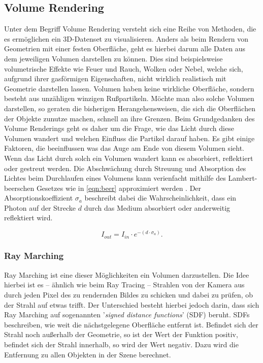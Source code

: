 \newpage
\subsection{Volume Rendering}

Unter dem Begriff Volume Rendering versteht sich eine Reihe von Methoden, die es ermöglichen ein 3D-Datenset zu visualisieren.
Anders als beim Rendern von Geometrien mit einer festen Oberfläche, geht es hierbei darum alle Daten aus
dem jeweiligen Volumen darstellen zu können. Dies sind beispielsweise volumetrische Effekte wie Feuer und Rauch, Wolken oder Nebel,
welche sich, aufgrund ihrer gasförmigen Eigenschaften, nicht wirklich realistisch mit Geometrie darstellen lassen.
Volumen haben keine wirkliche Oberfläche, sondern besteht aus unzähligen winzigen Rußpartikeln.
Möchte man also solche Volumen darstellen, so geraten die bisherigen Herangehensweisen, die sich die Oberflächen der Objekte zunutze machen,
schnell an ihre Grenzen. Beim Grundgedanken des Volume Renderings geht es daher um die Frage, wie das Licht durch diese Volumen
wandert und welchen Einfluss die Partikel darauf haben.
Es gibt einige Faktoren, die beeinflussen was das Auge am Ende von diesem Volumen sieht. Wenn das Licht durch solch ein Volumen wandert
kann es absorbiert, reflektiert oder gestreut werden.
Die Abschwächung durch Streuung und Absorption des Lichtes beim Durchlaufen eines Volumens kann verienfacht mithilfe des Lambert-beerschen Gesetzes wie in \autoref{eqn:beer}
approximiert werden \parencite{Mayerhofer2020}.
Der Absorptionskoeffizient $\sigma_a$ beschreibt dabei die Wahrscheinlichkeit, dass ein Photon auf der Strecke $d$ durch das Medium absorbiert oder anderweitig
reflektiert wird.

\vspace{-0.5cm  }
\begin{equation}
	\label{eqn:beer}
	I_{out} = I_{in} \cdot e^{- ( d \cdot\sigma_a  )}.
\end{equation}





\subsubsection{Ray Marching}

Ray Marching ist eine dieser Möglichkeiten ein Volumen darzustellen. Die Idee hierbei ist es – ähnlich wie beim Ray Tracing –
Strahlen von der Kamera aus durch jeden Pixel des zu rendernden Bildes zu schicken und dabei zu prüfen, ob der Strahl auf etwas trifft.
Der Unterschied besteht hierbei jedoch darin, dass sich Ray Marching auf sogenannten '\textit{signed distance functions}' (SDF) beruht.
SDFs beschreiben, wie weit die nächstgelegene Oberfläche entfernt ist. Befindet sich der Strahl noch außerhalb der Geometrie, so ist
der Wert der Funktion positiv, befindet sich der Strahl innerhalb, so wird der Wert negativ. Dazu wird die Entfernung zu allen Objekten
in der Szene berechnet.

